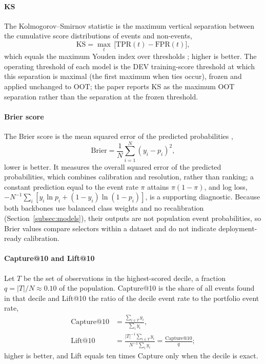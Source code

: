 \documentclass[final,5p,twocolumn]{elsarticle}
\newcommand{\KS}{\mathrm{KS}}
\newcommand{\TPR}{\mathrm{TPR}}
\newcommand{\FPR}{\mathrm{FPR}}
\begin{document}
\paragraph{KS}
The Kolmogorov--Smirnov statistic is the maximum vertical separation between the cumulative score distributions of events and non-events,
\begin{equation}
    \KS=\max_{t}\,\big[\TPR(t)-\FPR(t)\big],
    \label{eq:ks}
\end{equation}
which equals the maximum Youden index over thresholds \cite{youden1950}; higher is better. The operating threshold of each model is the DEV training-score threshold at which this separation is maximal (the first maximum when ties occur), frozen and applied unchanged to OOT; the paper reports KS as the maximum OOT separation rather than the separation at the frozen threshold.

\paragraph{Brier score}
The Brier score is the mean squared error of the predicted probabilities \cite{brier1950},
\begin{equation}
    \mathrm{Brier}=\frac{1}{N}\sum_{i=1}^{N}(y_i-p_i)^2 ,
    \label{eq:brier}
\end{equation}
lower is better. It measures the overall squared error of the predicted probabilities, which combines calibration and resolution, rather than ranking; a constant prediction equal to the event rate $\pi$ attains $\pi(1-\pi)$, and log loss, $-N^{-1}\sum_i[y_i\ln p_i+(1-y_i)\ln(1-p_i)]$, is a supporting diagnostic. Because both backbones use balanced class weights and no recalibration (Section~\ref{subsec:models}), their outputs are not population event probabilities, so Brier values compare selectors within a dataset and do not indicate deployment-ready calibration.

\paragraph{Capture@10 and Lift@10}
Let $T$ be the set of observations in the highest-scored decile, a fraction $q=|T|/N\approx0.10$ of the population. Capture@10 is the share of all events found in that decile and Lift@10 the ratio of the decile event rate to the portfolio event rate,
\begin{equation}
\begin{aligned}
    \mathrm{Capture@10}&=\frac{\sum_{i\in T}y_i}{\sum_{i}y_i},\\
    \mathrm{Lift@10}&=\frac{|T|^{-1}\sum_{i\in T}y_i}{N^{-1}\sum_{i}y_i}=\frac{\mathrm{Capture@10}}{q};
\end{aligned}
    \label{eq:capture10}
\end{equation}
higher is better, and Lift equals ten times Capture only when the decile is exact.
\end{document}
